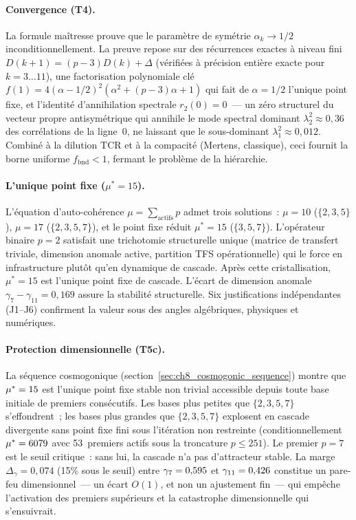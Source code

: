 \documentclass[12pt,a4paper]{article}
\begin{document}
\paragraph{Convergence (T4).}
La formule maîtresse prouve que le paramètre de symétrie
$\alpha_k \to 1/2$ inconditionnellement. La preuve repose sur des
récurrences exactes à niveau fini $D(k{+}1) = (p{-}3)D(k) + \Delta$
(vérifiées à précision entière exacte pour $k = 3\ldots 11$), une
factorisation polynomiale clé
$f(1) = 4(\alpha - 1/2)^2(\alpha^2 + (p{-}3)\alpha + 1)$ qui fait de
$\alpha = 1/2$ l'unique point fixe, et l'identité d'annihilation
spectrale $r_2(0) = 0$~--- un zéro structurel du vecteur propre
antisymétrique qui annihile le mode spectral dominant
$\lambda_2^2 \approx 0{,}36$ des corrélations de la ligne~0, ne
laissant que le sous-dominant $\lambda_1^2 \approx 0{,}012$.
Combiné à la dilution TCR et à la compacité (Mertens, classique),
ceci fournit la borne uniforme $f_{\mathrm{bnd}} < 1$, fermant le
problème de la hiérarchie.

\paragraph{L'unique point fixe ($\mu^* = 15$).}
L'équation d'auto-cohérence $\mu = \sum_{\text{actifs}} p$ admet
trois solutions~: $\mu = 10$ ($\{2,3,5\}$), $\mu = 17$
($\{2,3,5,7\}$), et le point fixe réduit $\mu^* = 15$
($\{3,5,7\}$). L'opérateur binaire $p = 2$ satisfait une trichotomie
structurelle unique (matrice de transfert triviale, dimension anomale
active, partition TFS opérationnelle) qui le force en infrastructure
plutôt qu'en dynamique de cascade. Après cette cristallisation,
$\mu^* = 15$ est l'unique point fixe de cascade. L'écart de
dimension anomale $\gamma_7 - \gamma_{11} = 0{,}169$ assure la
stabilité structurelle. Six justifications indépendantes (J1--J6)
confirment la valeur sous des angles algébriques, physiques et
numériques.

\paragraph{Protection dimensionnelle (T5c).}
La séquence cosmogonique (section~\ref{sec:ch8_cosmogonic_sequence})
montre que ${\mu^{*}} = 15$ est l'unique point fixe stable non trivial
accessible depuis toute base initiale de premiers consécutifs. Les
bases plus petites que $\{2,3,5,7\}$ s'effondrent~; les bases plus
grandes que $\{2,3,5,7\}$ explosent en cascade divergente sans
point fixe fini sous l'itération non restreinte
(conditionnellement ${\mu^{*}} = 6079$ avec 53~premiers actifs sous
la troncature $p \leq 251$). Le premier $p = 7$ est le seuil
critique~: sans lui, la cascade n'a pas d'attracteur stable. La
marge $\Delta_\gamma = 0{,}074$ (15\% sous le seuil) entre
$\gamma_{7} = 0{,}595$ et $\gamma_{11} = 0{,}426$ constitue un
pare-feu dimensionnel~--- un écart $O(1)$, et non un ajustement
fin~--- qui empêche l'activation des premiers supérieurs et la
catastrophe dimensionnelle qui s'ensuivrait.
\end{document}
